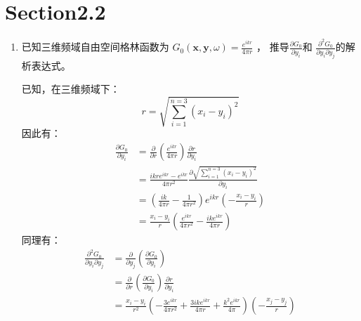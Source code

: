 \section*{Section2.2}

\begin{enumerate}
    \item 已知三维频域自由空间格林函数为
        $ G_{0} \left( \mathbf{x},\mathbf{y},\omega \right) = \frac{e^{i k r}}{4 \pi r} $ ，
        推导$ \frac{ \partial G_{0} }{ \partial y_{i} } $和
        $ \frac{ \partial^{2} G_{0} }{ \partial y_{i} \partial y_{j} } $的解析表达式。

        已知，在三维频域下：
        \begin{equation}
            r = \sqrt{ \sum^{n = 3}_{i = 1} \left( x_{i} - y_{i} \right)^{2}}
        \end{equation}
        因此有：
        \begin{equation}
            \begin{aligned}
                \frac{ \partial G_{0} }{ \partial y_{i} }
                &= \frac{ \partial }{ \partial r } \left(  \frac{e^{i k r}}{4 \pi r} \right) \frac{ \partial r }{ \partial y_{i} }\\
                &= \frac{i k r e^{ikr} - e^{ikr} }{4 \pi r^{2}} \frac{\partial \sqrt{ \sum^{n = 3}_{i = 1} \left( x_{i} - y_{i} \right)^{2}} }{\partial y_{i}} \\
                &= \left(\frac{i k}{4 \pi r} - \frac{1}{4 \pi r^{2}}\right) e^{ikr} \left(- \frac{x_{i} - y_{i}}{r}\right)\\
                &= \frac{x_{i} - y_{i}}{r} \left(\frac{e^{ikr}}{4 \pi r^{2}}-\frac{i k e^{ikr}}{4 \pi r}\right)
            \end{aligned}
        \end{equation}
        同理有：
        \begin{equation}
            \begin{aligned}
                \frac{ \partial^{2} G_{0} }{ \partial y_{i} \partial y_{j} }
                &= \frac{ \partial }{ \partial y_{j} } \left(\frac{ \partial G_{0} }{ \partial y_{i} } \right) \\
                &= \frac{ \partial }{ \partial r } \left(\frac{ \partial G_{0} }{ \partial y_{i} } \right) \frac{ \partial r }{ \partial y_{i} } \\
                &= \frac{x_{i}-y_{i}}{r^2} \left( - \frac{3 e^{ikr}}{4 \pi r^2} + \frac{3 i k e^{ikr}}{4 \pi r} + \frac{k^{2} e^{ikr}}{4 \pi }\right) \left(-\frac{x_{j}-y_{j}}{r}\right) \\

\end{aligned}
\end{equation}
\end{enumerate}
